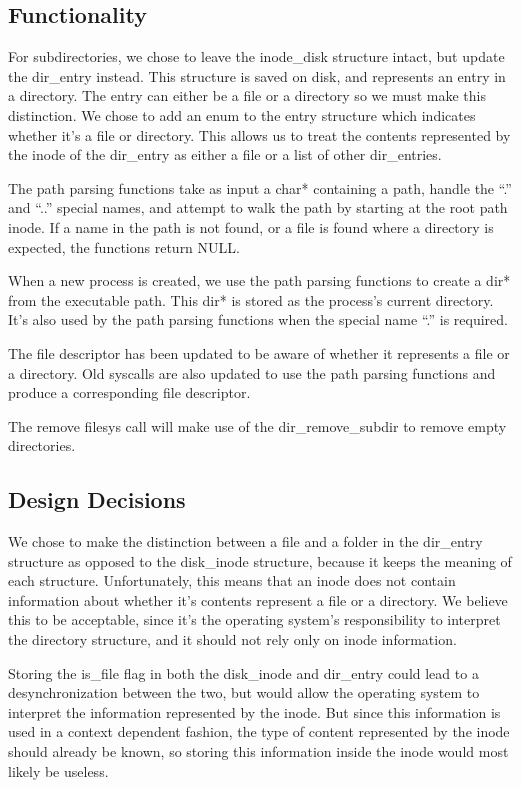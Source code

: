\subsection{Functionality}

For subdirectories, we chose to leave the inode\_disk structure intact, but update the dir\_entry instead. This structure is saved on disk, and represents an entry in a directory. The entry can either be a file or a directory so we must make this distinction. We chose to add an enum to the entry structure which indicates whether it's a file or directory. This allows us to treat the contents represented by the inode of the dir\_entry as either a file or a list of other dir\_entries.

The path parsing functions take as input a char* containing a path, handle the ``.'' and ``..'' special names, and attempt to walk the path by starting at the root path inode. If a name in the path is not found, or a file is found where a directory is expected, the functions return NULL.

When a new process is created, we use the path parsing functions to create a dir* from the executable path. This dir* is stored as the process's current directory. It's also used by the path parsing functions when the special name ``.'' is required.

The file descriptor has been updated to be aware of whether it represents a file or a directory. Old syscalls are also updated to use the path parsing functions and produce a corresponding file descriptor.

The remove filesys call will make use of the dir\_remove\_subdir to remove empty directories.

\subsection{Design Decisions}
  
We chose to make the distinction between a file and a folder in the dir\_entry structure as opposed to the disk\_inode structure, because it keeps the meaning of each structure. Unfortunately, this means that an inode does not contain information about whether it's contents represent a file or a directory. We believe this to be acceptable, since it's the operating system's responsibility to interpret the directory structure, and it should not rely only on inode information. 

Storing the is\_file flag in both the disk\_inode and dir\_entry could lead to a desynchronization between the two, but would allow the operating system to interpret the information represented by the inode. But since this information is used in a context dependent fashion, the type of content represented by the inode should already be known, so storing this information inside the inode would most likely be useless.


